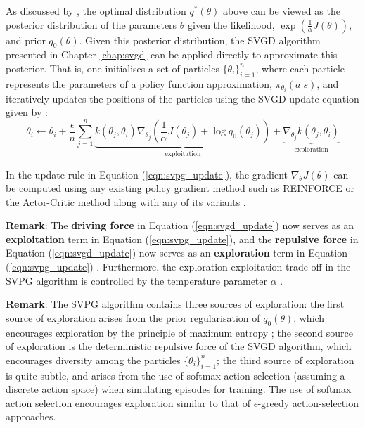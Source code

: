 As discussed by \citet{liu_svpg}, the optimal distribution $q^*(\theta)$ above can be viewed as the posterior distribution of the parameters $\theta$ given the likelihood, $\exp \left(\frac{1}{\alpha}J(\theta) \right)$, and prior $q_0(\theta)$. Given this posterior distribution, the SVGD algorithm presented in Chapter \ref{chap:svgd} can be applied directly to approximate this posterior. That is, one initialises a set of particles $\{\theta_i\}_{i=1}^n$, where each particle represents the parameters of a policy function approximation, $\pi_{\theta_i}(a|s)$, and iteratively updates the positions of the particles using the SVGD update equation given by \citet{liu_svpg}:
\renewcommand{\theequation}{4.7}
\begin{equation}
\label{eqn:svpg_update}
\theta_i \leftarrow \theta_i + \frac{\epsilon}{n}\sum_{j=1}^n \underbrace{k(\theta_j, \theta_i) \nabla_{\theta_j} \left(\frac{1}{\alpha}J(\theta_j) + \log q_0(\theta_j) \right)}_{\text{exploitation}} + \underbrace{\nabla_{\theta_j}k(\theta_j, \theta_i)}_{\text{exploration}}
\end{equation}

In the update rule in Equation (\ref{eqn:svpg_update}), the gradient $\nabla_{\theta}J(\theta)$ can be computed using any existing policy gradient method such as REINFORCE \citep{williams_reinforce} or the Actor-Critic method along with any of its variants \citep{liu_svpg}.

\textbf{Remark}: The \textbf{driving force} in Equation (\ref{eqn:svgd_update}) now serves as an \textbf{exploitation} term in Equation (\ref{eqn:svpg_update}), and the \textbf{repulsive force} in Equation (\ref{eqn:svgd_update}) now serves as an \textbf{exploration} term in Equation (\ref{eqn:svpg_update}) \citep{liu_svpg}. Furthermore, the exploration-exploitation trade-off in the SVPG algorithm is controlled by the temperature parameter $\alpha$ \citep{liu_svpg}.

\textbf{Remark}: The SVPG algorithm contains three sources of exploration: the first source of exploration arises from the prior regularisation of $q_0(\theta)$, which encourages exploration by the principle of maximum entropy \citep{liu_svpg}; the second source of exploration is the deterministic repulsive force of the SVGD algorithm, which encourages diversity among the particles $\{\theta_i\}_{i=1}^n$; the third source of exploration is quite subtle, and arises from the use of softmax action selection (assuming a discrete action space) when simulating episodes for training. The use of softmax action selection encourages exploration similar to that of $\epsilon$-greedy action-selection approaches.

